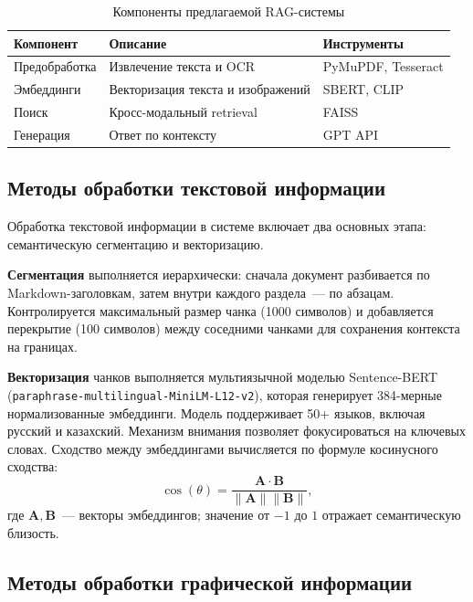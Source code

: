 \documentclass[a4paper,12pt]{article}
\begin{document}
\begin{table}[H]
    \centering
    \caption{Компоненты предлагаемой RAG-системы}
    \label{tab:components-ch2}
    \begin{tabular}{|l|l|l|}
        \hline
        \textbf{Компонент} & \textbf{Описание} & \textbf{Инструменты} \\
        \hline
        Предобработка & Извлечение текста и OCR & PyMuPDF, Tesseract \\
        \hline
        Эмбеддинги & Векторизация текста и изображений & SBERT, CLIP \\
        \hline
        Поиск & Кросс-модальный retrieval & FAISS \\
        \hline
        Генерация & Ответ по контексту & GPT API \\
        \hline
    \end{tabular}
\end{table}

\subsection{Методы обработки текстовой информации}

Обработка текстовой информации в системе включает два основных этапа: семантическую сегментацию и векторизацию.

\textbf{Сегментация} выполняется иерархически: сначала документ разбивается по Markdown-заголовкам, затем внутри каждого раздела~--- по абзацам. Контролируется максимальный размер чанка (1000 символов) и добавляется перекрытие (100 символов) между соседними чанками для сохранения контекста на границах.

\textbf{Векторизация} чанков выполняется мультиязычной моделью Sentence-BERT (\texttt{paraphrase\hbox{-}multilingual\hbox{-}MiniLM\hbox{-}L12\hbox{-}v2}), которая генерирует 384-мерные нормализованные эмбеддинги. Модель поддерживает 50+ языков, включая русский и казахский. Механизм внимания позволяет фокусироваться на ключевых словах. Сходство между эмбеддингами вычисляется по формуле косинусного сходства:
\[
\cos(\theta) = \frac{\mathbf{A} \cdot \mathbf{B}}{\|\mathbf{A}\| \|\mathbf{B}\|},
\]
где $\mathbf{A}, \mathbf{B}$~--- векторы эмбеддингов; значение от $-1$ до $1$ отражает семантическую близость.

\subsection{Методы обработки графической информации}
\end{document}
